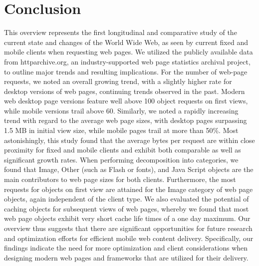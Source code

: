 \section*{Conclusion}
\label{s:conc}
This overview represents the first longitudinal and comparative study of the current state and changes of the World Wide Web, as seen by current fixed and mobile clients when requesting web pages.
We utilized the publicly available data from httparchive.org, an industry-supported web page statistics archival project, to outline major trends and resulting implications.
For the number of web-page requests, we noted an overall growing trend, with a slightly higher rate for desktop versions of web pages, continuing trends observed in the past. 
Modern web desktop page versions feature well above 100 object requests on first views, while mobile versions trail above 60.
Similarly, we noted a rapidly increasing trend with regard to the average web page sizes, with desktop pages surpassing 1.5 MB in initial view size, while mobile pages trail at more than 50\%.
Most astonishingly, this study found that the average bytes per request are within close proximity for fixed and mobile clients and exhibit both comparable as well as significant growth rates.
When performing decomposition into categories, we found that Image, Other (such as Flash or fonts), and Java Script objects are the main contributors to web page sizes for both clients. Furthermore, the most requests for objects on first view are attained for the Image category of web page objects, again independent of the client type.
We also evaluated the potential of caching objects for subsequent views of web pages, whereby we found that most web page objects exhibit very short cache life times of a one day maximum.
Our overview thus suggests that there are significant opportunities for future research and optimization efforts for efficient mobile web content delivery. 
Specifically, our findings indicate the need for more optimization and client considerations when designing modern web pages and frameworks that are utilized for their delivery.
